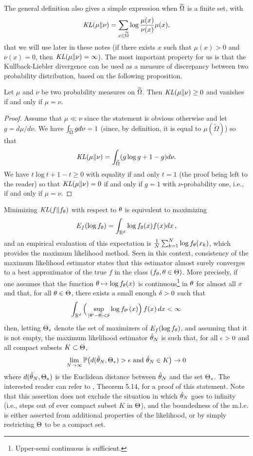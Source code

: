 The general definition also gives a simple expression when $\widetilde {\Omega}$ is a finite set, with
\[
\mathit{KL}(\mu\|\nu) = \sum_{x\in\widetilde{\Omega}} \log \frac{\mu(x)}{\nu(x)} \mu(x),
\]
that we will use later in these notes (if there exists $x$ such that $\mu(x) > 0$ and $\nu(x) =0$, then $\mathit{KL}(\mu\|\nu)=\infty$).  The most important property for us is that the Kullback-Liebler divergence can be used as a measure of discrepancy between two probability distribution, based on the following proposition.
\begin{proposition}
\label{prop:kl}
Let $\mu$ and $\nu$ be two probability measures on $\widetilde {\Omega}$. Then
  $\mathit{KL}(\mu\|\nu)\geq 0$ and vanishes if and only if $\mu=\nu$.
  \end{proposition}
\begin{proof}
Assume that $\mu\ll\nu$ since the statement is obvious otherwise and let $g = d\mu/d\nu$. We have $\int_{\widetilde {\Omega}} g d\nu = 1$ (since, by definition, it is equal to $\mu(\widetilde \Omega)$) so that 
\[
\mathit{KL}(\mu\|\nu) = \int_{\widetilde \Omega} (g\log g + 1 - g) d\nu.
\] 
We have $t\log t + 1-t \geq 0$ with equality if and only $t=1$ (the proof being left to the reader) so that $\mathit{KL}(\mu\|\nu) = 0$ if and only if $g=1$ with $\nu$-probability one, i.e., if and only if $\mu=\nu$. 
\end{proof}
\bigskip



Minimizing $\mathit{KL}(f\| f_\theta)$ with respect to $\theta$ is equivalent to maximizing
$$
E_f(\log f_\theta) = \int_{{\mathbb{R}}^d} \log f_\theta(x) f(x) dx\,,
$$
and
an empirical evaluation of this expectation is
$\frac{1}{N} \sum_{k=1}^N \log f_\theta(x_k)$, which provides the maximum
likelihood method. Seen in this context, consistency of the maximum likelihood estimator states that this estimator almost surely converges to a best approximator of
the true $f$ in the class $(f_\theta, \theta\in\Theta)$. More precisely, if one assumes that the function $\theta \mapsto \log f_\theta(x)$ is continuous\footnote{Upper-semi continuous is  sufficient.} in $\theta$ for almost all $x$ and that, for all $\theta \in \Theta$, there exists a small enough $\delta >0$ such that
\[
\int_{{\mathbb{R}}^d} \Big(\sup_{|\theta'-\theta|<\delta} \log f_{\theta'}(x)\Big)\, f(x)\, dx  < \infty
\]
then, letting $\Theta_*$ denote the set of maximizers of $E_f(\log f_\theta)$, and assuming that it is not empty, the maximum likelihood estimator ${\hat{\theta}}_N$ is such that, for all $\epsilon>0$ and all compact subsets $K\subset \Theta$, 
\[
\lim_{N\to \infty} \bm{\mathbb P}\big(d({\hat{\theta}}_N, \Theta_*) > \epsilon \text{ and } {\hat{\theta}}_N\in K\big) \to 0
\]
where $d({\hat{\theta}}_N, \Theta_*)$ is the Euclidean distance between ${\hat{\theta}}_N$ and the set $\Theta_*$. 
The interested reader can refer to \citet{van2000asymptotic}, Theorem 5.14, for a proof of this statement. Note that this assertion does not exclude the situation in which ${\hat{\theta}}_N$ goes to infinity (i.e., steps out of ever compact subset $K$ in $\Theta$), and the boundedness of the m.l.e. is either asserted from additional properties of the likelihood, or by simply restricting $\Theta$ to be a compact set.

